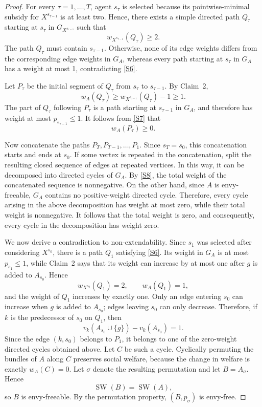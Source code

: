 \begin{proof}
For every $\tau=1,\ldots,T$, agent $s_\tau$ is selected because its pointwise-minimal subsidy for $X^{s_{\tau-1}}$ is at least two. Hence, there exists a simple directed path $Q_\tau$ starting
at $s_\tau$ in $G_{X^{s_{\tau-1}}}$ such that
\begin{equation}\label{S6}
w_{X^{s_{\tau-1}}}(Q_\tau)\geq2.
\end{equation}
The path $Q_\tau$ must contain $s_{\tau-1}$. Otherwise, none of its edge weights differs from the corresponding edge weights in $G_A$, whereas every path starting at $s_\tau$ in $G_A$ has a weight at most 1, contradicting \eqref{S6}.



Let $P_\tau$ be the initial segment of $Q_\tau$ from $s_\tau$ to $s_{\tau-1}$. By Claim~2,
\begin{equation}\label{S7}
 w_A(Q_\tau)
\geq
w_{X^{s_{\tau-1}}}(Q_\tau)-1
\geq1.
\end{equation}
The part of $Q_\tau$ following $P_\tau$ is a path starting at $s_{\tau-1}$ in $G_A$, and therefore has weight at most $p_{s_{\tau-1}}\leq1$. It follows from \eqref{S7} that
\begin{equation}\label{S8}
w_A(P_\tau)\geq0.
\end{equation}

Now concatenate the paths $P_T,P_{T-1},\ldots,P_1$. Since $s_T=s_0$, this concatenation starts and ends at $s_0$. If some vertex is repeated in the concatenation, split the resulting closed sequence of edges at repeated vertices. In this way, it can be decomposed into directed cycles of $G_A$. By \eqref{S8}, the total weight of the concatenated sequence is nonnegative. On the other hand, since $A$ is envy-freeable, $G_A$ contains no positive-weight directed cycle. Therefore, every cycle arising in the above decomposition has weight at most zero, while their total weight is nonnegative. It follows that the total weight is zero, and consequently, every cycle in the decomposition has weight zero.

We now derive a contradiction to non-extendability. Since $s_1$ was selected after considering $X^{s_0}$, there is a path $Q_1$ satisfying \eqref{S6}. Its weight in $G_A$ is at most $p_{s_1}\leq1$, while Claim~2 says that its weight can increase by at most one after $g$ is added to $A_{s_0}$. Hence
\[
w_{X^{s_0}}(Q_1)=2,
\qquad
w_A(Q_1)=1,
\]
and the weight of $Q_1$ increases by exactly one. Only an edge entering $s_0$ can increase when $g$ is added to $A_{s_0}$; edges leaving $s_0$ can only decrease. Therefore, if $k$ is the predecessor of $s_0$ on $Q_1$, then
\begin{equation}\label{S9}
v_k(A_{s_0}\cup\{g\})-v_k(A_{s_0})=1.
\end{equation}
Since the edge $(k,s_0)$ belongs to $P_1$, it belongs to one of the zero-weight directed cycles obtained above. Let $C$ be such a cycle. Cyclically permuting the bundles of $A$ along $C$ preserves social welfare, because the change in welfare is exactly $w_A(C)=0$. Let $\sigma$ denote the resulting permutation and let $B=A_\sigma$. Hence
\[
\operatorname{SW}(B)=\operatorname{SW}(A),
\] so $B$ is envy-freeable. By the permutation property, $(B,p_\sigma)$ is envy-free.


\end{proof}

